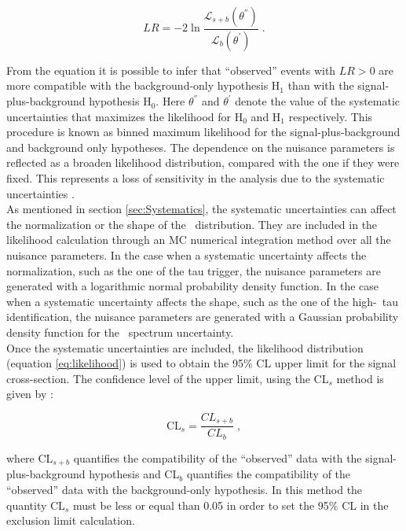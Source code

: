 \begin{equation}\label{eq:LR}
LR = -2 \ln \frac{\mathcal{L}_{s+b}(\theta^{''})}{\mathcal{L}_{b}(\theta^{'})} \; .
\end{equation}

\noindent From the equation it is possible to infer that ``observed'' events with $LR > 0$ are more 
compatible with the background-only hypothesis H$_{1}$ than with the signal-plus-background 
hypothesis H$_{0}$. Here $\theta^{''}$ and $\theta^{'}$ denote the value of the 
systematic uncertainties that maximizes the likelihood for H$_{0}$ and H$_{1}$
respectively. This procedure is known as binned maximum likelihood for the 
signal-plus-background and background only hypotheses. The dependence on the nuisance parameters 
is reflected as a broaden likelihood distribution, compared with the one if they were fixed. This 
represents a loss of sensitivity in the analysis due to the systematic uncertainties \cite{CLs1Cowan}.\\

\noindent As mentioned in section \ref{sec:Systematics}, the systematic uncertainties can 
affect the normalization or the shape of the \mass~distribution. They are included 
in the likelihood calculation through an MC numerical integration method over all the 
nuisance parameters. In the case when a systematic uncertainty affects the normalization,
such as the one of the tau trigger, the nuisance parameters are generated with a 
logarithmic normal probability density function. In the case when a systematic
uncertainty affects the shape, such as the one of the high-\pt~tau identification, the nuisance
parameters are generated with a Gaussian probability density function 
for the \mass~spectrum uncertainty. \\

\noindent Once the systematic uncertainties are included, the likelihood distribution 
(equation \ref{eq:likelihood}) is used to obtain the 95$\%$ CL upper limit 
for the signal cross-section. The confidence level of the upper limit, 
using the CL$_{s}$ method is given by \cite{CLs1Cowan}:

\begin{equation}\label{eq:CL}
 \textrm{CL}_{s} = \frac{CL_{s+b}}{CL_{b}} \; ,
\end{equation}

\noindent where CL$_{s+b}$ quantifies the compatibility of the ``observed'' data with the
signal-plus-background hypothesis and CL$_{b}$ quantifies the compatibility of the ``observed'' data 
with the background-only hypothesis. In this method the quantity  CL$_{s}$ must be less or equal 
than 0.05 in order to set the 95$\%$ CL in the exclusion limit calculation. \\

